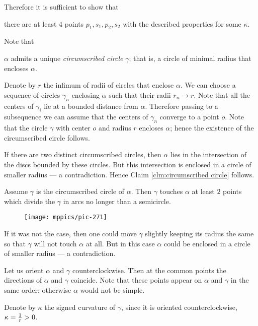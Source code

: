 Therefore it is sufficient to show that

\begin{clm}{}\label{clm-key}
there are at least 4 points $p_1,s_1,p_2,s_2$ with the described properties for some $\kappa$.
\end{clm}


Note that
\begin{clm}{}\label{clm:circumscribed circle}
$\alpha$
admits a unique \emph{circumscribed circle} $\gamma$; that is, a circle of minimal radius that encloses $\alpha$.
\end{clm}

Denote by $r$ the infimum of radii of circles that enclose $\alpha$.
We can choose a sequence of circles $\gamma_n$ enclosing $\alpha$ such that their radii $r_n\to r$.
Note that all the centers of $\gamma_i$ lie at a bounded distance from $\alpha$.
Therefore passing to a subsequence we can assume that the centers of $\gamma_n$ converge to a point $o$.
Note that the circle $\gamma$ with center $o$ and radius $r$ encloses $\alpha$;
hence the existence of the circumscribed circle follows.

If there are two distinct circumscribed circles, then $\alpha$ lies in the intersection of the discs bounded by these circles.
But this intersection is enclosed in a circle of smaller radius --- a contradiction.
Hence Claim \ref{clm:circumscribed circle} follows.


\begin{clm}{}
Assume $\gamma$ is the circumscribed circle of $\alpha$.
Then $\gamma$ touches $\alpha$ at least $2$ points which divide the $\gamma$ in arcs no longer than a semicircle.
\end{clm}

\begin{wrapfigure}{r}{38 mm}
\vskip-4mm
\centering
\texttt{[image: mppics/pic-271]}
\vskip0mm
\end{wrapfigure}


If it was not the case, then one could move $\gamma$ slightly keeping its radius the same so that $\gamma$ will not touch $\alpha$ at all.
But in this case $\alpha$ could be enclosed in a circle of smaller radius --- a contradiction.


Let us orient $\alpha$ and $\gamma$ counterclockwise.
Then at the common points the directions of $\alpha$ and $\gamma$ coincide.
Note that these points appear on $\alpha$ and $\gamma$ in the same order;
otherwise $\alpha$ would not be simple.

Denote by $\kappa$ the signed curvature of $\gamma$, since it is oriented counterclockwise,
$\kappa\z=\tfrac1r>0$.


